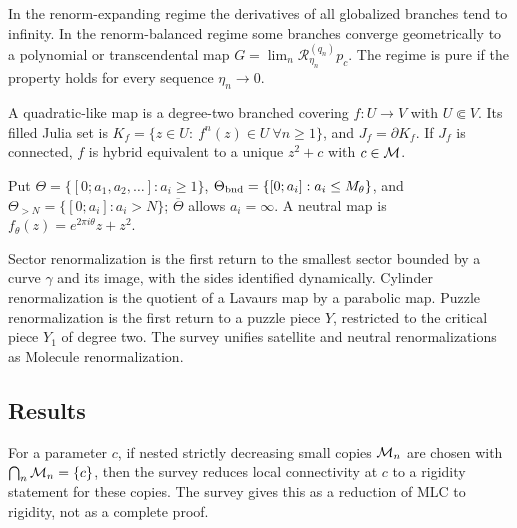 \begin{definition}
\label{def:survey-expanding}
In the renorm-expanding regime the derivatives of all globalized branches tend to
infinity.  In the renorm-balanced regime some branches converge geometrically to
a polynomial or transcendental map $G=\lim_n\mathcal R^{(q_n)}_{\eta_n}p_c$.
The regime is pure if the property holds for every sequence $\eta_n\to0$.
\end{definition}

\begin{definition}
\label{def:survey-ql}
A quadratic-like map is a degree-two branched covering $f\colon U\to V$ with
$U\Subset V$.  Its filled Julia set is $K_f=\{z\in U:\ f^n(z)\in U\ \forall n\ge1\}$,
and $J_f=\partial K_f$.  If $J_f$ is connected, $f$ is hybrid equivalent to a
unique $z^2+c$ with $c\in\mathcal M$.
\end{definition}

\begin{definition}
\label{def:survey-rotation}
Put $\Theta=\{[0;a_1,a_2,\dots]:a_i\ge1\}$, $\Theta_{\rm bnd}=\{[0;a_i]:a_i\le M_\theta\}$,
and $\Theta_{>N}=\{[0;a_i]:a_i>N\}$; $\overline\Theta$ allows $a_i=\infty$.
A neutral map is $f_\theta(z)=e^{2\pi i\theta}z+z^2$.
\end{definition}

\begin{definition}
\label{def:survey-other-renorm}
Sector renormalization is the first return to the smallest sector bounded by a
curve $\gamma$ and its image, with the sides identified dynamically.  Cylinder
renormalization is the quotient of a Lavaurs map by a parabolic map.  Puzzle
renormalization is the first return to a puzzle piece $Y$, restricted to the
critical piece $Y_1$ of degree two.  The survey unifies satellite and neutral
renormalizations as Molecule renormalization.
\end{definition}

\subsection*{Results}

\begin{theorem}
\label{thm:survey-yoccoz-reduction}
For a parameter $c$, if nested strictly decreasing small copies $\mathcal M_n$ are chosen
with $\bigcap_n\mathcal M_n=\{c\}$, then the survey reduces local connectivity at $c$ to a
rigidity statement for these copies.  The survey gives this as a reduction of MLC
to rigidity, not as a complete proof.
\end{theorem}

